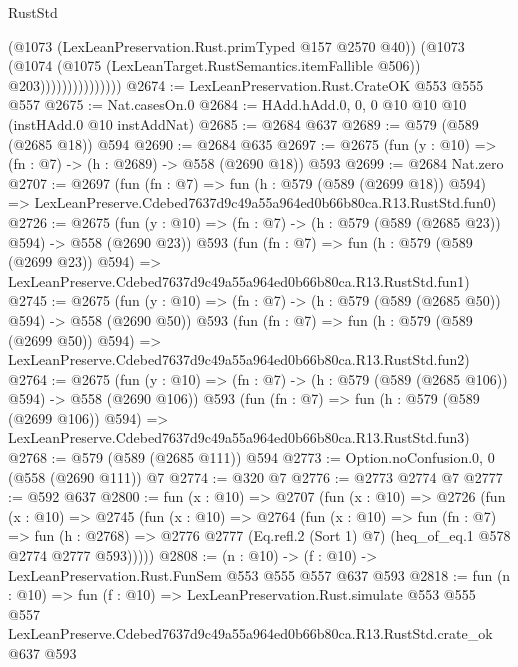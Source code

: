 \begin{lexlean}{RustStd}
\begin{coremodule}
                              (@1073 (LexLeanPreservation.Rust.primTyped @157 @2570 @40))
                              (@1073
                                (@1074
                                  (@1075 (LexLeanTarget.RustSemantics.itemFallible @506))
                                  @203)))))))))))))))
@2674 := LexLeanPreservation.Rust.CrateOK @553 @555 @557
@2675 := Nat.casesOn.{0}
@2684 := HAdd.hAdd.{0, 0, 0} @10 @10 @10 (instHAdd.{0} @10 instAddNat)
@2685 := @2684 @637
@2689 := @579 (@589 (@2685 @18)) @594
@2690 := @2684 @635
@2697 := @2675 (fun (y : @10) => (fn : @7) -> (h : @2689) -> @558 (@2690 @18)) @593
@2699 := @2684 Nat.zero
@2707 := @2697
    (fun (fn : @7) =>
    fun (h : @579 (@589 (@2699 @18)) @594) =>
    LexLeanPreserve.Cdebed7637d9c49a55a964ed0b66b80ca.R13.RustStd.fun0)
@2726 := @2675
    (fun (y : @10) => (fn : @7) -> (h : @579 (@589 (@2685 @23)) @594) -> @558 (@2690 @23))
    @593
    (fun (fn : @7) =>
    fun (h : @579 (@589 (@2699 @23)) @594) =>
    LexLeanPreserve.Cdebed7637d9c49a55a964ed0b66b80ca.R13.RustStd.fun1)
@2745 := @2675
    (fun (y : @10) => (fn : @7) -> (h : @579 (@589 (@2685 @50)) @594) -> @558 (@2690 @50))
    @593
    (fun (fn : @7) =>
    fun (h : @579 (@589 (@2699 @50)) @594) =>
    LexLeanPreserve.Cdebed7637d9c49a55a964ed0b66b80ca.R13.RustStd.fun2)
@2764 := @2675
    (fun (y : @10) => (fn : @7) -> (h : @579 (@589 (@2685 @106)) @594) -> @558 (@2690 @106))
    @593
    (fun (fn : @7) =>
    fun (h : @579 (@589 (@2699 @106)) @594) =>
    LexLeanPreserve.Cdebed7637d9c49a55a964ed0b66b80ca.R13.RustStd.fun3)
@2768 := @579 (@589 (@2685 @111)) @594
@2773 := Option.noConfusion.{0, 0} (@558 (@2690 @111)) @7
@2774 := @320 @7
@2776 := @2773 @2774 @7
@2777 := @592 @637
@2800 := fun (x : @10) =>
  @2707
    (fun (x : @10) =>
    @2726
      (fun (x : @10) =>
      @2745
        (fun (x : @10) =>
        @2764
          (fun (x : @10) =>
          fun (fn : @7) =>
          fun (h : @2768) =>
          @2776 @2777 (Eq.refl.{2} (Sort 1) @7) (heq_of_eq.{1} @578 @2774 @2777 @593)))))
@2808 := (n : @10) -> (f : @10) -> LexLeanPreservation.Rust.FunSem @553 @555 @557 @637 @593
@2818 := fun (n : @10) =>
  fun (f : @10) =>
  LexLeanPreservation.Rust.simulate
    @553
    @555
    @557
    LexLeanPreserve.Cdebed7637d9c49a55a964ed0b66b80ca.R13.RustStd.crate_ok
    @637
    @593
\end{coremodule}
\end{lexlean}
